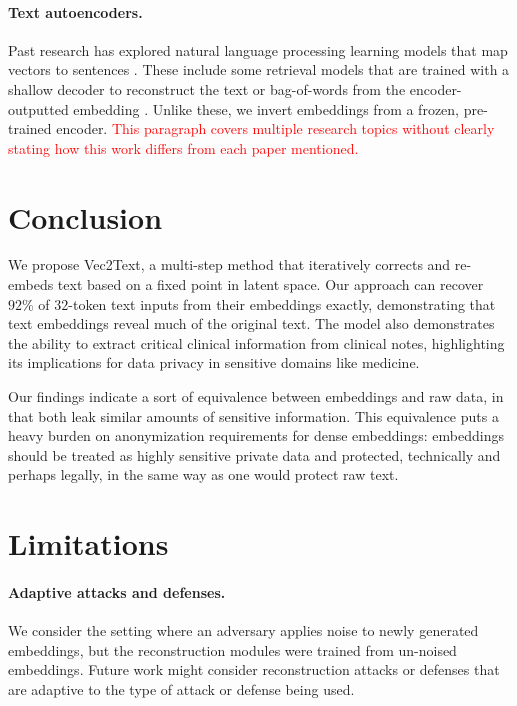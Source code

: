 \documentclass[11pt]{article}
\newcommand{\MethodName}{Vec2Text}
\begin{document}
\paragraph{Text autoencoders.} Past research has explored natural language processing learning models that map vectors to sentences \cite{bowman2016generating}. These include some retrieval models that are trained with a shallow decoder to reconstruct the text or bag-of-words from the encoder-outputted embedding \cite{xiao2022retromae,shen2023lexmae,wang2023simlm}. Unlike these, we invert embeddings from a frozen, pre-trained encoder.
\textcolor{red}{This paragraph covers multiple research topics without clearly stating how this work differs from each paper mentioned.}

\section{Conclusion}

We propose \MethodName, a multi-step method that iteratively corrects and re-embeds text based on a fixed point in latent space. Our approach can recover $92\%$  of $32$-token text inputs from their embeddings exactly, demonstrating that text embeddings reveal much of the original text. The model also demonstrates the ability to extract critical clinical information from clinical notes, highlighting its implications for data privacy in sensitive domains like medicine.

Our findings indicate a sort of equivalence between embeddings and raw data, in that both leak similar amounts of sensitive information. This equivalence puts a heavy burden on anonymization requirements for dense embeddings: embeddings should be treated as highly sensitive private data and protected, technically and perhaps legally, in the same way as one would protect raw text.


\section{Limitations}


\paragraph{Adaptive attacks and defenses.} We consider the setting where an adversary applies noise to newly generated embeddings, but the reconstruction modules were trained from un-noised embeddings. Future work might consider reconstruction attacks or defenses that are adaptive to the type of attack or defense being used.
\end{document}
